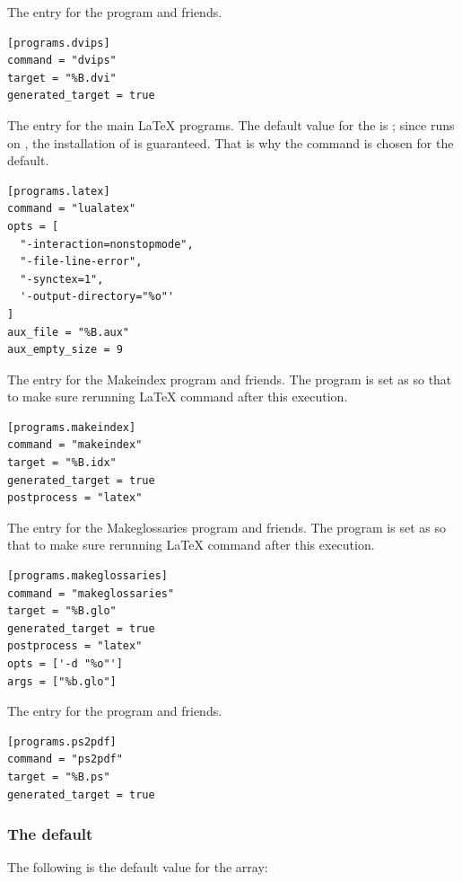 \documentclass{llmk-doc}
\begin{document}
 The entry for the  program and friends.
%
\begin{lstlisting}[style=toml]
[programs.dvips]
command = "dvips"
target = "%B.dvi"
generated_target = true
\end{lstlisting}

 The entry for the main {\LaTeX} programs. The default value for
the  is ; since  runs on
, the installation of {\LuaTeX} is guaranteed. That is why the
command is chosen for the default.
%
\begin{lstlisting}[style=toml]
[programs.latex]
command = "lualatex"
opts = [
  "-interaction=nonstopmode",
  "-file-line-error",
  "-synctex=1",
  '-output-directory="%o"'
]
aux_file = "%B.aux"
aux_empty_size = 9
\end{lstlisting}

 The entry for the Makeindex program and friends. The
 program is set as  so that to make sure
rerunning {\LaTeX} command after this execution.
%
\begin{lstlisting}[style=toml]
[programs.makeindex]
command = "makeindex"
target = "%B.idx"
generated_target = true
postprocess = "latex"
\end{lstlisting}

 The entry for the Makeglossaries program and friends. The
 program is set as  so that to make sure
rerunning {\LaTeX} command after this execution.
%
\begin{lstlisting}[style=toml]
[programs.makeglossaries]
command = "makeglossaries"
target = "%B.glo"
generated_target = true
postprocess = "latex"
opts = ['-d "%o"']
args = ["%b.glo"]
\end{lstlisting}

 The entry for the  program and friends.
%
\begin{lstlisting}[style=toml]
[programs.ps2pdf]
command = "ps2pdf"
target = "%B.ps"
generated_target = true
\end{lstlisting}

\subsubsection{The default }
\label{sec:default-sequence}

The following is the default value for the  array:
%
\begin{htcode}
\end{htcode}
\end{document}
